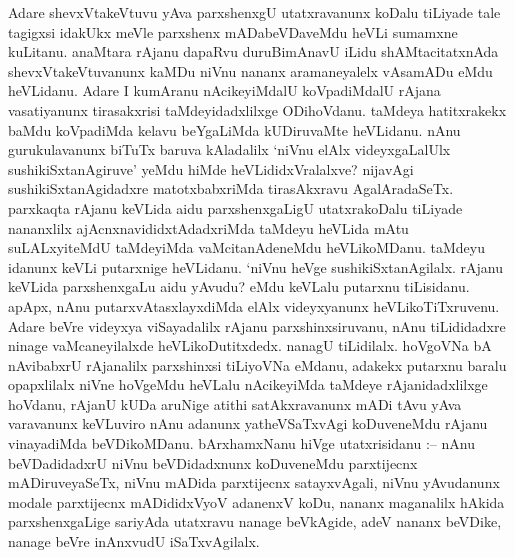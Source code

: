 \begin{artha}
Adare shevxVtakeVtuvu yAva parxshenxgU utatxravanunx koDalu tiLiyade tale tagigxsi idakUkx  meVle parxshenx mADabeVDaveMdu heVLi sumamxne kuLitanu. anaMtara rAjanu dapaRvu duruBimAnavU iLidu shAMtacitatxnAda shevxVtakeVtuvanunx kaMDu niVnu nananx aramaneyalelx vAsamADu eMdu heVLidanu. Adare I kumAranu nAcikeyiMdalU koVpadiMdalU rAjana vasatiyanunx tirasakxrisi taMdeyidadxlilxge ODihoVdanu. taMdeya hatitxrakekx baMdu koVpadiMda kelavu beYgaLiMda kUDiruvaMte heVLidanu. nAnu gurukulavanunx biTuTx baruva kAladalilx `niVnu elAlx videyxgaLalUlx sushikiSxtanAgiruve' yeMdu hiMde heVLididxVralalxve? nijavAgi sushikiSxtanAgidadxre matotxbabxriMda tirasAkxravu AgalAradaSeTx. parxkaqta rAjanu keVLida aidu parxshenxgaLigU utatxrakoDalu tiLiyade nananxlilx ajAcnxnavididxtAdadxriMda taMdeyu heVLida mAtu suLALxyiteMdU taMdeyiMda vaMcitanAdeneMdu heVLikoMDanu. taMdeyu idanunx keVLi putarxnige heVLidanu. `niVnu heVge sushikiSxtanAgilalx. rAjanu keVLida parxshenxgaLu aidu yAvudu? eMdu keVLalu putarxnu tiLisidanu. apApx, nAnu putarxvAtasxlayxdiMda elAlx videyxyanunx heVLikoTiTxruvenu. Adare beVre videyxya viSayadalilx rAjanu parxshinxsiruvanu, nAnu tiLididadxre ninage vaMcaneyilalxde heVLikoDutitxdedx. nanagU tiLidilalx. hoVgoVNa bA nAvibabxrU rAjanalilx parxshinxsi tiLiyoVNa eMdanu, adakekx putarxnu baralu opapxlilalx niVne hoVgeMdu heVLalu nAcikeyiMda taMdeye rAjanidadxlilxge hoVdanu, rAjanU kUDa aruNige atithi satAkxravanunx mADi tAvu yAva varavanunx keVLuviro nAnu adanunx yatheVSaTxvAgi koDuveneMdu rAjanu vinayadiMda beVDikoMDanu. bArxhamxNanu hiVge utatxrisidanu :-- nAnu beVDadidadxrU niVnu beVDidadxnunx koDuveneMdu parxtijecnx mADiruveyaSeTx, niVnu mADida parxtijecnx satayxvAgali, niVnu yAvudanunx modale parxtijecnx mADididxVyoV adanenxV koDu, nananx maganalilx hAkida parxshenxgaLige sariyAda utatxravu nanage beVkAgide, adeV nananx beVDike, nanage beVre inAnxvudU iSaTxvAgilalx.
\end{artha}

